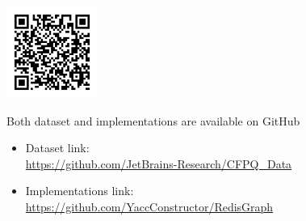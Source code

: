 \documentclass[a0paper,portrait]{baposter}
\begin{document}
\begin{poster}
{\begin{minipage}[t]{0.65\textwidth}
\end{minipage}
~
\begin{minipage}[t]{3cm}
\includegraphics[width=3cm]{qr-research-jetbra.pdf}
\vspace{0.5cm}
\end{minipage}
\vspace{1cm}
{\scriptsize
Both dataset and implementations are available on GitHub
\vspace{-1cm}
\begin{itemize}
	\item Dataset link:\\
	\url{https://github.com/JetBrains-Research/CFPQ_Data}\\
	\item Implementations link:\\
	\url{https://github.com/YaccConstructor/RedisGraph}
\end{itemize}
}



}




\end{poster}
\end{document}
